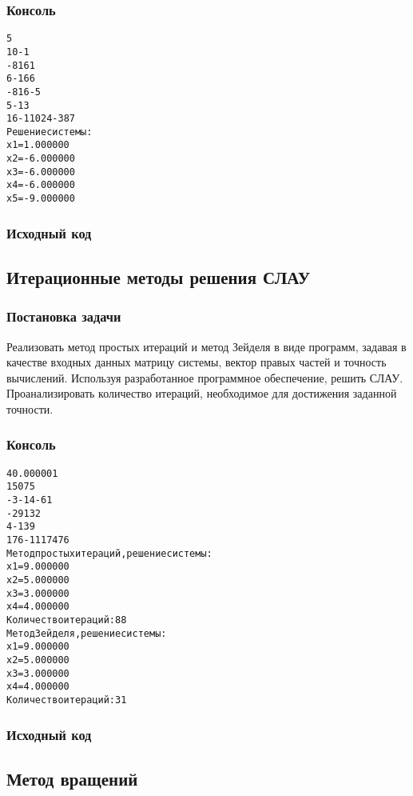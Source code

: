 \subsubsection{Консоль}
\begin{alltt}
5
10 -1
-8 16 1
6 -16 6
-8 16 -5
5 -13
16 -110 24 -3 87
Решение системы: 
x1 = 1.000000
x2 = -6.000000
x3 = -6.000000
x4 = -6.000000
x5 = -9.000000
\end{alltt}
\pagebreak

\subsubsection{Исходный код}

\pagebreak

\subsection{Итерационные методы решения СЛАУ}

\subsubsection{Постановка задачи}
Реализовать метод простых итераций и метод Зейделя в виде программ, задавая в качестве входных данных матрицу системы, вектор правых частей и точность вычислений. Используя разработанное программное обеспечение, решить СЛАУ. Проанализировать количество итераций, необходимое для достижения заданной точности.

\subsubsection{Консоль}
\begin{alltt}
4 0.000001
15 0 7 5
-3 -14 -6 1
-2 9 13 2
4 -1 3 9
176 -111 74 76
Метод простых итераций, решение системы:
x1 = 9.000000
x2 = 5.000000
x3 = 3.000000
x4 = 4.000000
Количество итераций: 88
Метод Зейделя, решение системы:
x1 = 9.000000
x2 = 5.000000
x3 = 3.000000
x4 = 4.000000
Количество итераций: 31

\end{alltt}
\pagebreak

\subsubsection{Исходный код}

\pagebreak

\subsection{Метод вращений}

